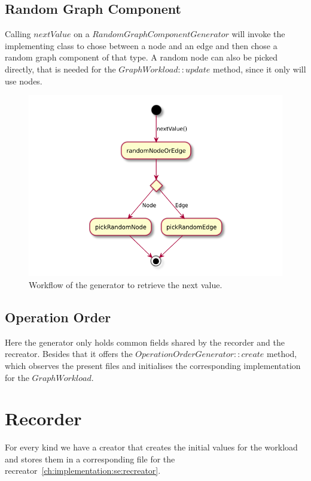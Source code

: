 \subsection{Random Graph Component}
Calling $ nextValue $ on a $ RandomGraphComponentGenerator $ will invoke the implementing class to chose between a node and an edge and then chose a random graph component of that type.
A random node can also be picked directly,
that is needed for the $ GraphWorkload::update $ method,
since it only will use nodes.

\begin{figure}[h!]
  \includegraphics{images/randomGraphComponentGenerator}
  \caption{Workflow of the generator to retrieve the next value.}
  \label{fig:randomGraphComponentGenerator}
\end{figure}

\subsection{Operation Order}
Here the generator only holds common fields shared by the recorder and the recreator.
Besides that it offers the $ OperationOrderGenerator::create $ method,
which observes the present files and initialises the corresponding implementation for the $ Graph Workload $.

\section{Recorder}
\label{ch:implementation:se:recorder}
For every kind we have a creator that creates the initial values for the workload and stores them in a corresponding file for the recreator~\ref{ch:implementation:se:recreator}.

